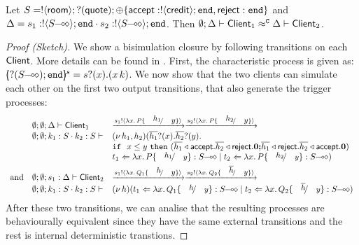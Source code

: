 \begin{proposition}\label{p:examp}
	Let
	$S = ! \langle \mathsf{room} \rangle ; ? (\mathsf{quote}) ; \oplus \{\mathsf{accept}: ! \langle \mathsf{credit} \rangle ; \mathtt{end}, \mathsf{reject}: \mathtt{end}\}$ and 
$\Delta = s_1: \btout{\lhot{S}} \tinact \cat s_2: \btout{\lhot{S}} \tinact$. 
Then
	$ \emptyset; \Delta \vdash \mathsf{Client}_1 \approx^\mathtt{C} \Delta \vdash \mathsf{Client}_2$. %
\vspace{-2mm}
\end{proposition}
\begin{proof}[Proof (Sketch)]
	\noi We show a bisimulation closure by following transitions on each $\mathsf{Client}$.
	More details  can be found in .
	First, the characteristic process is given as:
	$\mapchar{\btinp{\lhot{S}} \tinact}{s} = \binp{s}{x} (\appl{x}{k})$.
We now show that the two clients can simulate each other on
the first two output transitions, that also generate the trigger
processes:
%
\[
	\begin{array}{lll}
&	\es; \es; \Delta \proves \Client_1
	&
		\by{\bactout{s_1}{\abs{x}{P \subst{h_1}{y}}}}
		\by{\bactout{s_2}{\abs{x}{P \subst{h_2}{y}}}}
		\\
&		\es; \es; k_1: S \cat k_2: S \proves
		&
		\newsp{h_1, h_2}{\binp{\dual{h_1}}{x} \binp{\dual{h_2}}{y}\\
&		& \If\ x \leq y\ \Then (\bsel{\dual{h_1}}{\accept} \bsel{\dual{h_2}}{\reject} \inact
		\Else \bsel{\dual{h_1}}{\reject} \bsel{\dual{h_2}}{\accept} \inact)\\
&		& \ftrigger{t_1}{\abs{x}{P \subst{h_1}{y}}}{\lhot{S}} \Par \ftrigger{t_2}{\abs{x}{P \subst{h_2}{y}}}{\lhot{S}}}
		\\[1mm]
\mbox{and} &
		\es; \es; s_1: \Delta \proves \Client_2
		&\by{\bactout{s_1}{\abs{x}{Q_1 \subst{h}{y}}}}
		\by{\bactout{s_2}{\abs{x}{Q_2 \subst{\dual{h}}{y}}}}
		\\
&		\es; \es; k_1: S \cat k_2: S \proves & \newsp{h}{
		\ftrigger{t_1}{\abs{x}{Q_1 \subst{h}{y}}}{\lhot{S}} \Par \ftrigger{t_2}{\abs{x}{Q_2 \subst{\dual{h}}{y}}}{\lhot{S}}}
	\end{array}
\]
	\noi 
After these two  transitions, 
we can analise that 
the resulting processes are behaviourally equivalent
since they have the same external transitions and the rest 
is internal deterministic transtions. 
\end{proof}

